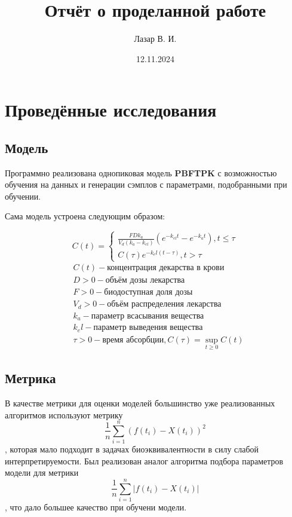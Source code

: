 \documentclass{article}
\title{Отчёт о проделанной работе}
\author{Лазар В. И.}
\date{12.11.2024}
\begin{document}
\maketitle

\section{Проведённые исследования}

\subsection{Модель}

Программно реализована однопиковая модель \textbf{PBFTPK} с возможностью обучения на данных и генерации сэмплов с параметрами, подобранными при обучении. \newline

Сама модель устроена следующим образом:

$$
	C(t) = \begin{cases}
		\frac{F D k_a}{V_d (k_a - k_{el})} (e^{-k_{el} t} - e^{-k_a t}), t \le \tau \\
		C(\tau)e^{-k_el (t - \tau)}, t > \tau
	\end{cases}
$$
\begin{align*}
	 & C(t) - \text{концентрация декарства в крови}                     \\
	 & D > 0 - \text{объём дозы лекарства}                              \\
	 & F > 0 - \text{биодоступная доля дозы}                            \\
	 & V_d > 0 - \text{объём распределения лекарства}                   \\
	 & k_a - \text{параметр всасывания вещества}                        \\
	 & k_el - \text{параметр выведения вещества}                        \\
	 & \tau > 0 - \text{время абсорбции}, C(\tau) = \sup_{t \ge 0} C(t)
\end{align*}


\subsection{Метрика}

В качестве метрики для оценки моделей большинство уже реализованных алгоритмов используют метрику \[
	\frac{1}{n}\sum_{i=1}^{n} (f(t_i) - X(t_i))^2
\], которая мало подходит в задачах биоэквивалентности в силу слабой интерпретируемости. Был реализован аналог алгоритма подбора параметров модели для метрики
\[
	\frac{1}{n}\sum_{i=1}^{n} |f(t_i) - X(t_i)|
\], что дало большее качество при обучени модели.
\end{document}
